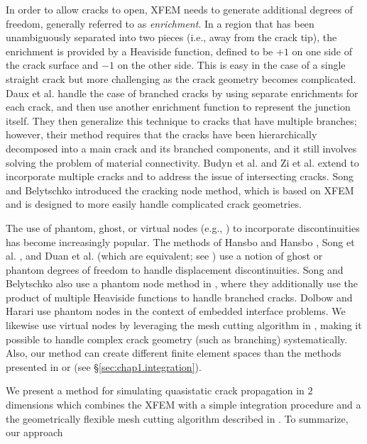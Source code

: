 In order to allow cracks to open, XFEM needs to generate additional degrees of freedom, generally referred to as \emph{enrichment}. In a region that has been unambiguously separated into two pieces (i.e., away from the crack tip), the enrichment is provided by a Heaviside function, defined to be $+1$ on one side of the crack surface and $-1$ on the other side. This is easy in the case of a single straight crack but more challenging as the crack geometry becomes complicated. Daux et al. \cite{Daux00} handle the case of branched cracks by using separate enrichments for each crack, and then use another enrichment function to represent the junction itself. They then generalize this technique to cracks that have multiple branches; however, their method requires that the cracks have been hierarchically decomposed into a main crack and its branched components, and it still involves solving the problem of material connectivity. Budyn et al. \cite{Budyn04} and Zi et al. \cite{Zi.G04} extend \cite{Daux00} to incorporate multiple cracks and to address the issue of intersecting cracks. Song and Belytschko \cite{Song09a} introduced the cracking node method, which is based on XFEM and is designed to more easily handle complicated crack geometries.

The use of phantom, ghost, or virtual nodes (e.g., \cite{Molino05}) to incorporate discontinuities has become increasingly popular. The methods of Hansbo and Hansbo \cite{Hansbo04}, Song et al. \cite{Song06}, and Duan et al. \cite{Duan09} (which are equivalent; see \cite{Areias06}) use a notion of ghost or phantom degrees of freedom to handle displacement discontinuities. Song and Belytschko also use a phantom node method in \cite{Song09b}, where they additionally use the product of multiple Heaviside functions to handle branched cracks. Dolbow and Harari \cite{Dolbow09} use phantom nodes in the context of embedded interface problems. We likewise use virtual nodes by leveraging the mesh cutting algorithm in \cite{Sifakis07}, making it possible to handle complex crack geometry (such as branching) systematically. Also, our method can create different finite element spaces than the methods presented in \cite{Hansbo04} or \cite{Song06} (see \S\ref{sec:chap1.integration}).

We present a method for simulating quasistatic crack propagation in $2$ dimensions which combines the XFEM with a simple integration procedure and a the geometrically flexible mesh cutting algorithm described in \cite{Sifakis07}. To summarize, our approach

